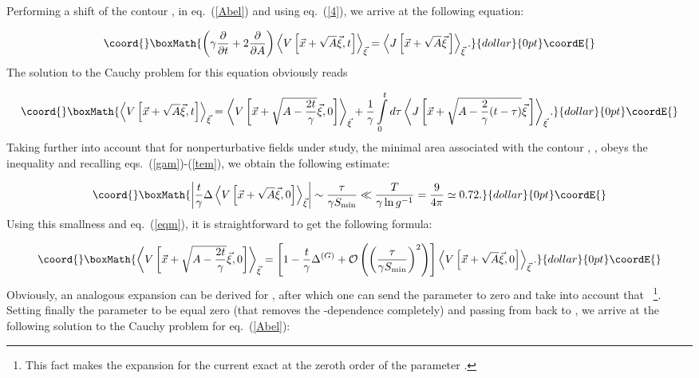 \documentclass[a4paper,12pt]{article}
\begin{document}
Performing a shift of the contour \coordHE{}, \coordHE{}
in eq.~(\ref{Abel}) and using eq.~(\ref{4}), we arrive at the following
equation:

$$\coord{}\boxMath{
\left(\gamma\frac{\partial}{\partial t}+2\frac{\partial}{\partial A}\right)
\left<V\left[\vec x+\sqrt{A}\vec\xi, t\right]\right>_{\vec\xi}=\left<J\left[\vec x+\sqrt{A}\vec\xi{\,}
\right]\right>_{\vec\xi}.}{dollar}{0pt}\coordE{}$$
The solution to the Cauchy problem for this equation obviously reads

$$\coord{}\boxMath{
\left<V\left[\vec x+\sqrt{A}\vec\xi, t\right]\right>_{\vec\xi}=
\left<V\left[\vec x+\sqrt{A-\frac{2t}{\gamma}}\vec\xi, 0\right]\right>_{\vec\xi}+\frac{1}{\gamma}
\int\limits_{0}^{t}d\tau\left<J\left[\vec x+\sqrt{A-\frac{2}{\gamma}(t-\tau)}\vec\xi{\,}\right]\right>_{\vec\xi}.}{dollar}{0pt}\coordE{}$$
Taking further into account that for nonperturbative fields under study,
the minimal area associated with the contour \coordHE{}, \coordHE{}, obeys the inequality
\coordHE{} and recalling eqs.~(\ref{gam})-(\ref{tem}), we obtain the following estimate:

$$\coord{}\boxMath{\left|\frac{t}{\gamma}\Delta\left<V\left[\vec x+\sqrt{A}\vec\xi, 0\right]\right>_{\vec\xi}\right|
\sim\frac{\tau}{\gamma S_{\rm min}}\ll\frac{T}{\gamma\ln g^{-1}}=\frac{9}{4\pi}\simeq 0.72.}{dollar}{0pt}\coordE{}$$
Using this smallness and eq.~(\ref{eqm}), it is straightforward to get the following formula:

$$\coord{}\boxMath{
\left<V\left[\vec x+\sqrt{A-\frac{2t}{\gamma}}\vec\xi, 0\right]\right>_{\vec\xi}=\left[1-\frac{t}{\gamma}
\Delta^{(G)}+{\cal O}\left(\left(\frac{\tau}{\gamma S_{\rm min}}\right)^2\right)\right]
\left<V\left[\vec x+\sqrt{A}\vec\xi, 0\right]\right>_{\vec\xi}.
}{dollar}{0pt}\coordE{}$$
Obviously, an analogous expansion can be derived for
\coordHE{}, after which one can send the parameter
\myHighlight{$\varepsilon$}\coordHE{} to zero and take into account that \coordHE{}~\footnote{This fact makes the expansion for
the current \coordHE{} exact at the zeroth order
of the parameter \coordHE{}.}. Setting finally the parameter \coordHE{} to be equal zero (that removes the
\myHighlight{$\vec\xi$}\coordHE{}-dependence completely) and passing from \coordHE{}
back to \coordHE{}, we arrive at the following solution to the Cauchy problem for eq.~(\ref{Abel}):
\end{document}
